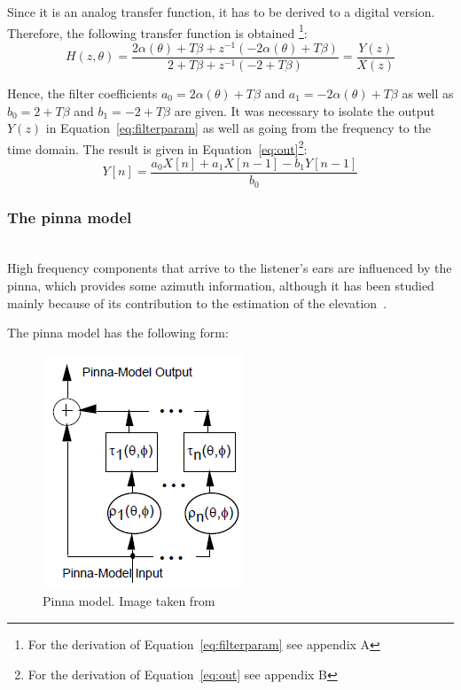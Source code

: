 \documentclass[journal]{IEEEtran}
\begin{document}
Since it is an analog transfer function, it has to be derived to a digital version. Therefore, the following  transfer function is obtained \footnote{For the derivation of Equation~\ref{eq:filterparam} see appendix A}:
\begin{equation}\label{eq:filterparam}
H\left( z,\theta\right) = \frac{2\alpha (\theta)+T\beta+z^{-1}(-2\alpha(\theta)+T\beta)}{2+T\beta+z^{-1}(-2+T\beta)} = \frac{Y(z)}{X(z)}
\end{equation} 

Hence, the filter coefficients $a_0 = 2\alpha (\theta)+T\beta$ and $a_1 = -2\alpha(\theta)+T\beta$ as well as $b_0 = 2+T\beta$ and $b_1 = -2+T\beta$ are given. 
It was necessary to isolate the output $Y(z)$ in Equation~\ref{eq:filterparam} as well as going from the frequency to the time domain. The result is given in Equation~\ref{eq:out}\footnote{For the derivation of Equation~\ref{eq:out} see appendix B}:
\begin{equation}\label{eq:out}
Y[n] =\frac{a_0X[n]+a_1X[n-1]-b_1Y[n-1]}{b_0}
\end{equation} 

\subsubsection{The pinna model}~\\
High frequency components that arrive to the listener's ears are influenced by the pinna, which provides some azimuth information, although it has been studied mainly because of its contribution to the estimation of the elevation~\cite{Brown1997}.

The pinna model has the following form:

\begin{figure}[h!]
  \centering
    \includegraphics[scale=0.75]{graphics/pinna_part.png}
  \caption{Pinna model. Image taken from~\cite{Brown1997}}
  \label{fig:pinnaModel}
\end{figure}
\end{document}
